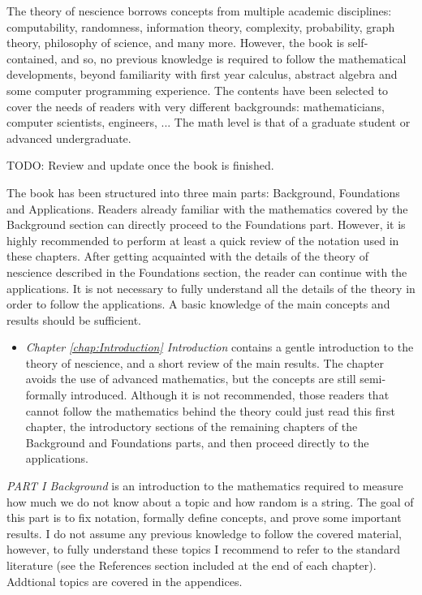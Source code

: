 The theory of nescience borrows concepts from multiple academic disciplines: computability, randomness, information theory, complexity, probability, graph theory, philosophy of science, and many more. However, the book is self-contained, and so, no previous knowledge is required to follow the mathematical developments, beyond familiarity with first year calculus, abstract algebra and some computer programming experience. The contents have been selected to cover the needs of readers with very different backgrounds: mathematicians, computer scientists, engineers, ... The math level is that of a graduate student or advanced undergraduate.

{\color{red} TODO: Review and update once the book is finished.}

The book has been structured into three main parts: Background, Foundations and Applications. Readers already familiar with the mathematics covered by the Background section can directly proceed to the Foundations part. However, it is highly recommended to perform at least a quick review of the notation used in these chapters. After getting acquainted with the details of the theory of nescience described in the Foundations section, the reader can continue with the applications. It is not necessary to fully understand all the details of the theory in order to follow the applications. A basic knowledge of the main concepts and results should be sufficient.

\bigskip

\begin{itemize}

\item \emph{Chapter \ref{chap:Introduction} Introduction} contains a gentle introduction to the theory of nescience, and a short review of the main results. The chapter avoids the use of advanced mathematics, but the concepts are still semi-formally introduced. Although it is not recommended, those readers that cannot follow the mathematics behind the theory could just read this first chapter, the introductory sections of the remaining chapters of the Background and Foundations parts, and then proceed directly to the applications.

\end{itemize}

\bigskip

\emph{PART I Background} is an introduction to the mathematics required to measure how much we do not know about a topic and how random is a string. The goal of this part is to fix notation, formally define concepts, and prove some important results. I do not assume any previous knowledge to follow the covered material, however, to fully understand these topics I recommend to refer to the standard literature (see the References section included at the end of each chapter). Addtional topics are covered in the appendices.

